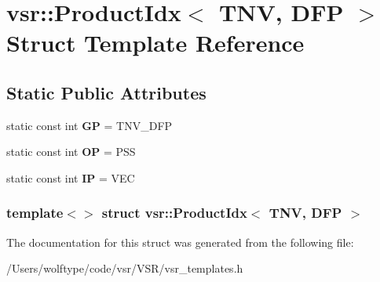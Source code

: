 \hypertarget{structvsr_1_1_product_idx_3_01_t_n_v_00_01_d_f_p_01_4}{\section{vsr\-:\-:Product\-Idx$<$ T\-N\-V, D\-F\-P $>$ Struct Template Reference}
\label{structvsr_1_1_product_idx_3_01_t_n_v_00_01_d_f_p_01_4}
}
\subsection*{Static Public Attributes}
\begin{DoxyCompactItemize}
\item 
\hypertarget{structvsr_1_1_product_idx_3_01_t_n_v_00_01_d_f_p_01_4_a6aa3a06788b77c62462dcca3d05e8d95}{static const int {\bfseries G\-P} = T\-N\-V\-\_\-\-D\-F\-P}\label{structvsr_1_1_product_idx_3_01_t_n_v_00_01_d_f_p_01_4_a6aa3a06788b77c62462dcca3d05e8d95}

\item 
\hypertarget{structvsr_1_1_product_idx_3_01_t_n_v_00_01_d_f_p_01_4_a7a1f9329143bcacb44982edb1e09e13f}{static const int {\bfseries O\-P} = P\-S\-S}\label{structvsr_1_1_product_idx_3_01_t_n_v_00_01_d_f_p_01_4_a7a1f9329143bcacb44982edb1e09e13f}

\item 
\hypertarget{structvsr_1_1_product_idx_3_01_t_n_v_00_01_d_f_p_01_4_a7086d85645bba12686e140b8079231ce}{static const int {\bfseries I\-P} = V\-E\-C}\label{structvsr_1_1_product_idx_3_01_t_n_v_00_01_d_f_p_01_4_a7086d85645bba12686e140b8079231ce}

\end{DoxyCompactItemize}
\subsubsection*{template$<$$>$ struct vsr\-::\-Product\-Idx$<$ T\-N\-V, D\-F\-P $>$}



The documentation for this struct was generated from the following file\-:\begin{DoxyCompactItemize}
\item 
/\-Users/wolftype/code/vsr/\-V\-S\-R/vsr\-\_\-templates.\-h\end{DoxyCompactItemize}
